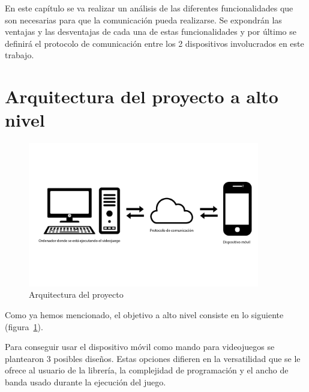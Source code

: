 En este cap\'itulo se va realizar un an\'alisis de las diferentes funcionalidades que son necesarias para que la comunicaci\'on pueda realizarse. Se expondr\'an las ventajas y las desventajas de cada una de estas funcionalidades y por \'ultimo se definir\'a el protocolo de comunicaci\'on entre los 2 dispositivos involucrados en este trabajo.


\section{Arquitectura del proyecto a alto nivel}

\begin{figure}[!htb]
    \centering
    \includegraphics[width=0.90\textwidth]{./Imagenes/Bitmap/resumen.png}
    \caption{Arquitectura del proyecto}
\label{Fig:arquitectura}
\end{figure}

Como ya hemos mencionado, el objetivo a alto nivel consiste en lo siguiente (figura~\ref{Fig:arquitectura}). 

Para conseguir usar el dispositivo m\'ovil como mando para videojuegos se plantearon 3 posibles dise\~nos. Estas opciones difieren en la versatilidad que se le ofrece al usuario de la librer\'ia, la complejidad de programaci\'on y el ancho de banda usado durante la ejecuci\'on del juego. \\

